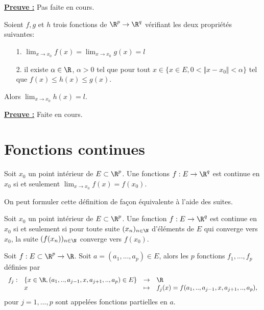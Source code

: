 \documentclass[class=report,crop=false]{standalone}
\begin{document}
\noindent \underline{\bf Preuve :}
Pas faite en cours.






\begin{theoreme}
\textcolor[rgb]{0.50,0.00,0.25}{
Soient $f, g$ et $h$ trois fonctions de $\R^p \rightarrow \R^q$ vérifiant les deux propriétés suivantes:
\begin{itemize}
\item[1.] $\displaystyle \lim_{x \rightarrow x_0} f(x)=\displaystyle \lim_{x \rightarrow x_0} g(x)=l$
\item[2.] il existe $\alpha \in \R$, $\alpha >0$ tel que pour tout $x \in \lbrace x \in E, 0< \Vert x-x_0 \Vert < \alpha \rbrace$ tel que $f(x) \leq h(x) \leq g(x)$.
\end{itemize}
Alors $\displaystyle \lim_{x \rightarrow x_0} h(x)=l$.
}
\end{theoreme}

\noindent \underline{\bf Preuve :}
Faite en cours.



\section{Fonctions continues}
\begin{definition}
\textcolor[rgb]{0.73,0.00,0.00}{
\noindent Soit $x_0$ un point intérieur de $E \subset \R^p$. Une fonctions $f: E \rightarrow \R^q$
est continue en $x_0$ si et seulement $\displaystyle \lim_{x \rightarrow x_0} f(x)=f(x_0)$.
}
\end{definition}



\noindent On peut formuler cette définition de façon équivalente à l'aide des suites.

\begin{definition}
\textcolor[rgb]{0.73,0.00,0.00}{
\noindent Soit $x_0$ un point intérieur de $E \subset \R^p$. Une fonction $f: E \rightarrow \R^q$
est continue en $x_0$ si et seulement si pour toute suite  $(x_n)_{n \in \N}$ 
d'éléments de $E$ qui converge vers $x_0$, la suite $(f(x_n))_{n \in \N}$ converge vers $f(x_0)$.
}
\end{definition}

\begin{definition}
\textcolor[rgb]{0.73,0.00,0.00}{
\noindent Soit $f: E \subset \R^p \rightarrow \R$. Soit $a=(a_1,...,a_p) \in E$, alors les 
$p$ fonctions $f_1, ..., f_p$ définies par 
\begin{equation*}
\begin{array}{llll}
f_j:& \lbrace x\in \R, (a_1,.., a_{j-1},x,a_{j+1},..,a_p) \in E\rbrace & \rightarrow & \R\\
 & x & \mapsto & f_j(x)=f(a_1,.., a_{j-1},x,a_{j+1},..,a_p),
\end{array}
\end{equation*}
pour $j=1,...,p$ sont appelées fonctions partielles en $a$.
}
\end{definition}
\end{document}
